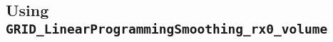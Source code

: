 \documentclass[12pt]{article}
\begin{document}
%
%
%
%
%




\subsection{Using {\tt GRID\_LinearProgrammingSmoothing\_rx0\_volume}}
\end{document}
